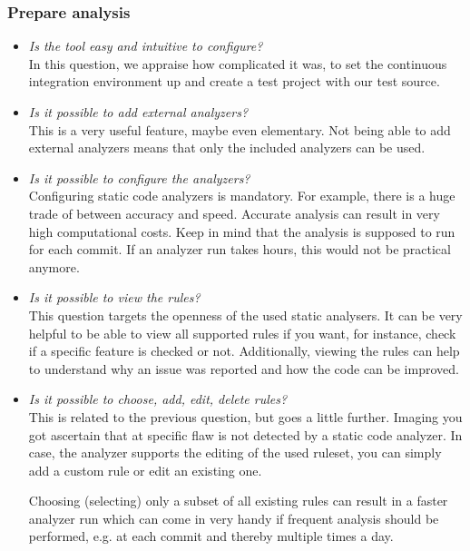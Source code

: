 \documentclass[conference]{IEEEtran}
\begin{document}
\subsubsection{Prepare analysis}
\label{subsubsec:evaluation_prepare}
\begin{itemize}
	\item \textit{Is the tool easy and intuitive to configure?} \\
	In this question, we appraise how complicated it was, to set the continuous integration environment up and create a test project with our test source.
	
	\item \textit{Is it possible to add external analyzers?} \\
	This is a very useful feature, maybe even elementary. Not being able to add external analyzers means that only the included analyzers can be used.
	
	\item \textit{Is it possible to configure the analyzers?} \\
	Configuring static code analyzers is mandatory. For example, there is a huge trade of between accuracy and speed. Accurate analysis can result in very high computational costs. Keep in mind that the analysis is supposed to run for each commit. If an analyzer run takes hours, this would not be practical anymore.
	
	\item \textit{Is it possible to view the rules?} \\
	This question targets the openness of the used static analysers. It can be very helpful to be able to view all supported rules if you want, for instance, check if a specific feature is checked or not. Additionally, viewing the rules can help to understand why an issue was reported and how the code can be improved.
	
	\item \textit{Is it possible to choose, add, edit, delete rules?} \\
	This is related to the previous question, but goes a little further. Imaging you got ascertain that at specific flaw is not detected by a static code analyzer. In case, the analyzer supports the editing of the used ruleset, you can simply add a custom rule or edit an existing one.
	
	Choosing (selecting) only a subset of all existing rules can result in a faster analyzer run which can come in very handy if frequent analysis should be performed, e.g. at each commit and thereby multiple times a day.
\end{itemize}
\end{document}

